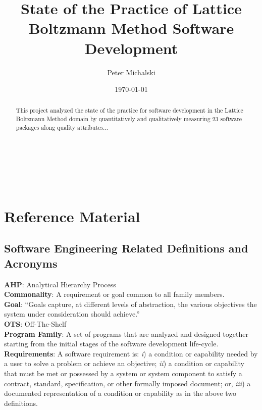 \documentclass[12pt, notitlepage]{article}
\title{State of the Practice of Lattice Boltzmann Method Software Development}
\author{Peter Michalski}
\date{\today}
\begin{document}
	\maketitle
	\begin{singlespace}
	\begin{abstract}
		This project analyzed the state of the practice for software development in the Lattice Boltzmann Method 
		domain by quantitatively and qualitatively measuring 23 software packages along quality attributes...
	\end{abstract}


\newpage

\tableofcontents
{}

~\newpage

\listoffigures

\listoftables

~\newpage
{}

\clearpage
\section{Reference Material}

\subsection{Software Engineering Related Definitions and Acronyms}

\noindent\textbf{AHP}: Analytical Hierarchy Process\\

\noindent\textbf{Commonality}: A requirement or goal common to all family members.\\

\noindent\textbf{Goal}: “Goals capture, at different levels of abstraction, the various objectives the system under consideration should achieve.” \citep{van2001goal}\\

\noindent\textbf{OTS}: Off-The-Shelf\\

\noindent\textbf{Program Family}: A set of programs that are analyzed and designed together starting from the initial stages of the software development life-cycle.\\

\noindent\textbf{Requirements}: A software requirement is: \textit{i}) a condition or capability needed by a user to solve a problem or achieve an objective; \textit{ii}) a condition or capability that must be met or possessed by a system or system component to satisfy a contract, standard, specification, or other formally imposed document; or, \textit{iii}) a documented representation of a condition or capability as in the above two definitions. \citep{thayer2000ieee}\\


\end{singlespace}
\end{document}
